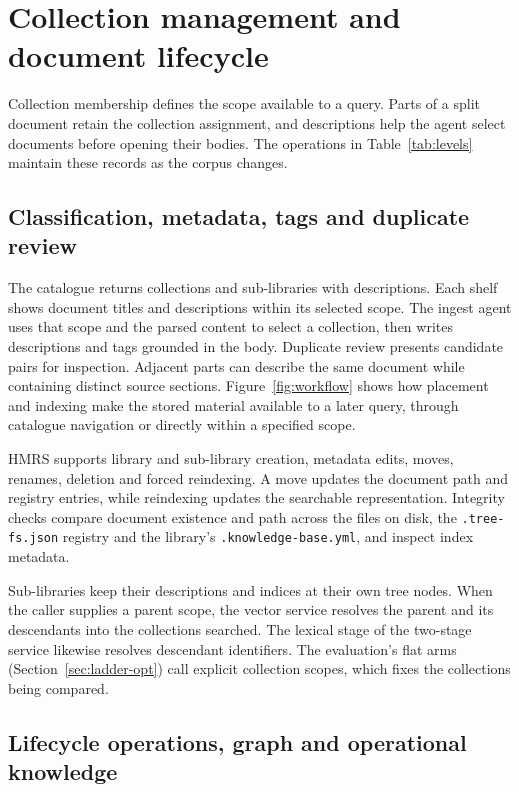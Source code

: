 \section{Collection management and document lifecycle}
\label{sec:organization}

Collection membership defines the scope available to a query. Parts of
a split document retain the collection assignment, and descriptions
help the agent select documents before opening their bodies. The
operations in Table~\ref{tab:levels} maintain these records as the corpus
changes.

\subsection{Classification, metadata, tags and duplicate review}
\label{sec:org-placement}
\label{sec:org-registries}
\label{sec:org-tags}
\label{sec:org-dedup}

The catalogue returns collections and sub-libraries with descriptions.
Each shelf shows document titles and descriptions within its selected scope.
The ingest agent uses that scope and the parsed content to select a
collection,
then writes descriptions and tags grounded in the body. Duplicate review
presents candidate pairs for inspection. Adjacent parts can describe
the same document while containing distinct source sections.
Figure~\ref{fig:workflow} shows how placement and indexing make the
stored material available to a later query, through catalogue navigation
or directly within a specified scope.

HMRS supports library and sub-library creation, metadata edits, moves,
renames, deletion and forced reindexing. A move updates the document path
and registry entries, while reindexing updates the searchable representation.
 Integrity checks compare document existence and path across the files on
disk, the \texttt{.tree-fs.json} registry and the library's
\texttt{.knowledge-base.yml}, and inspect index metadata.

Sub-libraries keep their descriptions and indices at their own tree nodes.
When the caller supplies a parent scope, the vector service resolves the
parent and its descendants into the collections searched. The lexical stage
of the two-stage service likewise resolves descendant identifiers. The
evaluation's flat arms (Section~\ref{sec:ladder-opt}) call explicit
collection scopes, which fixes the collections being compared.

\subsection{Lifecycle operations, graph and operational knowledge}
\label{sec:org-lifecycle}
\label{sec:org-graph}
\label{sec:org-experience}


